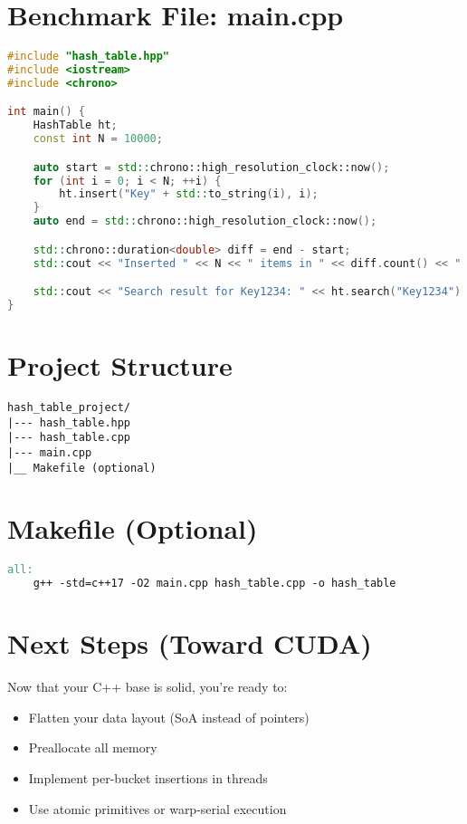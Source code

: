 \documentclass{article}
\begin{document}
\section*{Benchmark File: main.cpp}

\begin{lstlisting}[language=C++]
#include "hash_table.hpp"
#include <iostream>
#include <chrono>

int main() {
    HashTable ht;
    const int N = 10000;

    auto start = std::chrono::high_resolution_clock::now();
    for (int i = 0; i < N; ++i) {
        ht.insert("Key" + std::to_string(i), i);
    }
    auto end = std::chrono::high_resolution_clock::now();

    std::chrono::duration<double> diff = end - start;
    std::cout << "Inserted " << N << " items in " << diff.count() << " seconds.\n";

    std::cout << "Search result for Key1234: " << ht.search("Key1234") << "\n";
}
\end{lstlisting}

\section*{Project Structure}

\begin{verbatim}
hash_table_project/
|--- hash_table.hpp
|--- hash_table.cpp
|--- main.cpp
|__ Makefile (optional)
\end{verbatim}

\section*{Makefile (Optional)}

\begin{lstlisting}[language=make]
all:
    g++ -std=c++17 -O2 main.cpp hash_table.cpp -o hash_table
\end{lstlisting}

\section*{Next Steps (Toward CUDA)}

Now that your C++ base is solid, you’re ready to:
\begin{itemize}
    \item Flatten your data layout (SoA instead of pointers)
    \item Preallocate all memory
    \item Implement per-bucket insertions in threads
    \item Use atomic primitives or warp-serial execution
\end{itemize}
\end{document}
